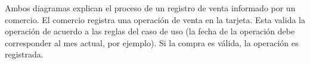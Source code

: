 \FloatBarrier

Ambos diagramas explican el proceso de un registro de venta informado por un comercio.
El comercio registra una operación de venta en la tarjeta. Esta valida la 
operación de acuerdo a las reglas del caso de uso (la fecha de la operación debe
corresponder al mes actual, por ejemplo). Si la compra es válida, la
operación es registrada.

\FloatBarrier
